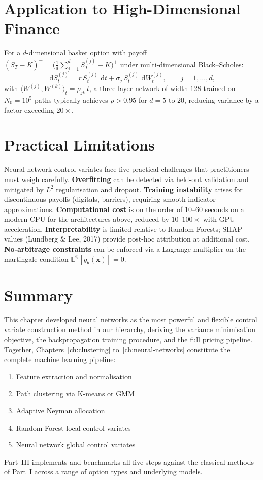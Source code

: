 \documentclass[12pt, a4paper]{report}
\theoremstyle{definition}
\newcommand{\Q}{\mathbb{Q}}
\newcommand{\dd}{\,\mathrm{d}}
\begin{document}
\section{Application to High-Dimensional Finance}
\label{sec:nn-finance}

For a $d$-dimensional basket option with payoff
$(\bar{S}_T - K)^+ = \bigl(\frac{1}{d}\sum_{j=1}^d S_T^{(j)} - K\bigr)^+$
under multi-dimensional Black--Scholes:
\begin{equation}
    \dd S_t^{(j)} = r\,S_t^{(j)}\,\dd t
    + \sigma_j\,S_t^{(j)}\,\dd W_t^{(j)}, \qquad j = 1, \ldots, d,
    \label{eq:multi-bs}
\end{equation}
with $\langle W^{(j)}, W^{(k)}\rangle_t = \rho_{jk}\,t$, a three-layer
network of width $128$ trained on $N_0 = 10^5$ paths typically achieves
$\rho > 0.95$ for $d = 5$ to $20$, reducing variance by a factor
exceeding $20\times$.

\section{Practical Limitations}
\label{sec:nn-limits}

Neural network control variates face five practical challenges that
practitioners must weigh carefully.  \textbf{Overfitting} can be
detected via held-out validation and mitigated by $L^2$ regularisation
and dropout.  \textbf{Training instability} arises for discontinuous
payoffs (digitals, barriers), requiring smooth indicator approximations.
\textbf{Computational cost} is on the order of $10$--$60$ seconds on a
modern CPU for the architectures above, reduced by $10$--$100\times$
with GPU acceleration.  \textbf{Interpretability} is limited relative
to Random Forests; SHAP values (Lundberg \& Lee, 2017) provide post-hoc
attribution at additional cost.  \textbf{No-arbitrage constraints} can
be enforced via a Lagrange multiplier on the martingale condition
$\mathbb{E}^{\Q}[g_\theta(\mathbf{x})] = 0$.

\section{Summary}
\label{sec:nn-summary}

This chapter developed neural networks as the most powerful and flexible
control variate construction method in our hierarchy, deriving the
variance minimisation objective, the backpropagation training procedure,
and the full pricing pipeline.  Together, Chapters~\ref{ch:clustering}
to~\ref{ch:neural-networks} constitute the complete machine learning
pipeline:
\begin{enumerate}
    \item Feature extraction and normalisation
    \item Path clustering via K-means or GMM
    \item Adaptive Neyman allocation
    \item Random Forest local control variates
    \item Neural network global control variates
\end{enumerate}
Part~III implements and benchmarks all five steps against the classical
methods of Part~I across a range of option types and underlying models.
\end{document}

